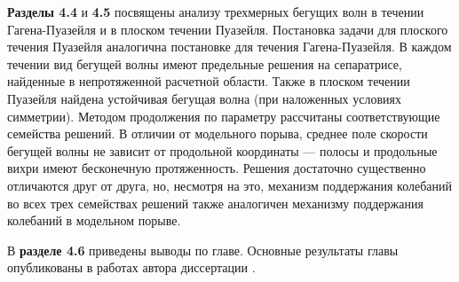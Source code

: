 \textbf{Разделы 4.4} и \textbf{4.5} посвящены анализу трехмерных бегущих волн в течении Гагена-Пуазейля и в плоском течении Пуазейля. Постановка задачи для плоского течения Пуазейля аналогична постановке для течения Гагена-Пуазейля. В каждом течении вид бегущей волны имеют предельные решения на сепаратрисе, найденные в непротяженной расчетной области. Также в плоском течении Пуазейля найдена устойчивая бегущая волна (при наложенных условиях симметрии). Методом продолжения по параметру рассчитаны соответствующие семейства решений. В отличии от модельного порыва, среднее поле скорости бегущей волны не зависит от продольной координаты --- полосы и продольные вихри имеют бесконечную протяженность. Решения достаточно существенно отличаются друг от друга, но, несмотря на это, механизм поддержания колебаний во всех трех семействах решений также аналогичен механизму поддержания колебаний в модельном порыве. 
 
В \textbf{разделе 4.6} приведены выводы по главе. Основные результаты главы опубликованы в работах автора диссертации \cite{Vest18, KMU2016, Lomonosov2018, Lomonosov2017, LomRead2017, LomRead2016, Ob2018}. 


